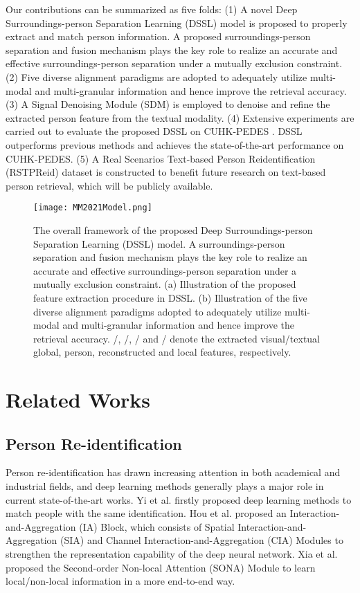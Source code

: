 \documentclass[sigconf]{acmart}
\begin{document}
Our contributions can be summarized as five folds: (1) A novel Deep Surroundings-person Separation Learning (DSSL) model is proposed to properly extract and match person information. A proposed surroundings-person separation and fusion mechanism plays the key role to realize an accurate and effective surroundings-person separation under a mutually exclusion constraint. (2) Five diverse alignment paradigms are adopted to adequately utilize multi-modal and multi-granular information and hence improve the retrieval accuracy. (3) A Signal Denoising Module (SDM) is employed to denoise and refine the extracted person feature from the textual modality. (4) Extensive experiments are carried out to evaluate the proposed DSSL on CUHK-PEDES \cite{Shuang2017Person}. DSSL outperforms previous methods and achieves the state-of-the-art performance on CUHK-PEDES. (5) A Real Scenarios Text-based Person Reidentification (RSTPReid) dataset is constructed to benefit future research on text-based person retrieval, which will be publicly available.

\begin{figure*}[h]
	\centering
	\texttt{[image: MM2021Model.png]}
	\caption{The overall framework of the proposed Deep Surroundings-person Separation Learning (DSSL) model. A surroundings-person separation and fusion mechanism plays the key role to realize an accurate and effective surroundings-person separation under a mutually exclusion constraint. (a) Illustration of the proposed feature extraction procedure in DSSL. (b) Illustration of the five diverse alignment paradigms adopted to adequately utilize multi-modal and multi-granular information and hence improve the retrieval accuracy. /, /, / and / denote the extracted visual/textual global, person, reconstructed and local features, respectively.}
	\label{fig:model}
\end{figure*}

\section{Related Works}
\subsection{Person Re-identification}
Person re-identification has drawn increasing attention in both academical and industrial fields, and deep learning methods generally plays a major role in current state-of-the-art works. Yi et al. \cite{yi2014deepreid} firstly proposed deep learning methods to match people with the same identification. Hou et al. \cite{IAM2019CVPR} proposed an Interaction-and-Aggregation (IA) Block, which consists of Spatial Interaction-and-Aggregation (SIA) and Channel Interaction-and-Aggregation (CIA) Modules to strengthen the representation capability of the deep neural network. Xia et al. \cite{SecondOrder2019} proposed the Second-order Non-local Attention (SONA) Module to learn local/non-local information in a more end-to-end way.
\end{document}
